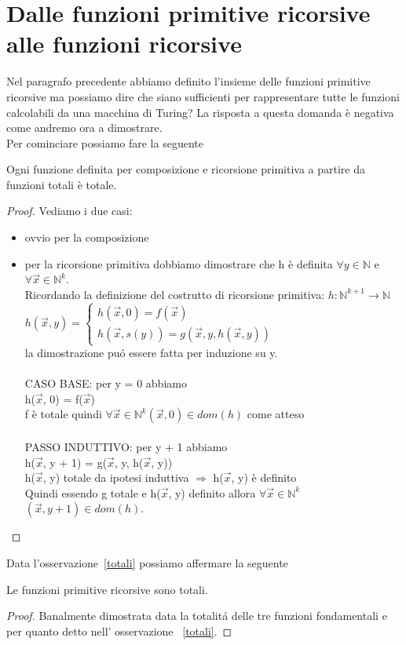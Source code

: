 \section{Dalle funzioni primitive ricorsive alle funzioni ricorsive}

Nel paragrafo precedente abbiamo definito l'insieme delle funzioni primitive
ricorsive ma possiamo dire che siano sufficienti per rappresentare tutte le
funzioni calcolabili da una macchina di Turing? La risposta a questa domanda \`e
negativa come andremo ora a dimostrare.\\
Per cominciare possiamo fare la seguente

\begin{osservazione}\label{totali} Ogni funzione definita per composizione e
ricorsione primitiva a partire da funzioni 
totali \`e totale.
\end{osservazione}
\begin{proof} Vediamo i due casi:\\
\begin{itemize}
\item ovvio per la composizione
\item per la ricorsione primitiva dobbiamo dimostrare che h \`e definita
$\forall y \in \mathbb{N}$ e $\forall \vec{x} \in \mathbb{N}^k$.\\
Ricordando la definizione del costrutto di ricorsione primitiva:
		$h:\mathbb{N}^{k+1} \to \mathbb{N}$\\
			$h(\vec{x},y)=\left\{ \begin{array}{ll}
			h(\vec{x}, 0) = f(\vec{x})\\
			h(\vec{x}, s(y)) = g(\vec{x},y,h(\vec{x},y))
			\end{array} \right.$\\
la dimostrazione pu\'o essere fatta per induzione su y.\\ \\
CASO BASE: per y = 0 abbiamo\\  h($\vec{x}$, 0) = f($\vec{x}$)\\
f \`e totale quindi $\forall \vec{x} \in \mathbb{N}^k (\vec{x}, 0) \in dom(h)$
come atteso\\ \\
PASSO INDUTTIVO: per y + 1 abbiamo\\
h($\vec{x}$, y + 1) = g($\vec{x}$, y, h($\vec{x}$, y))\\
h($\vec{x}$, y) totale da ipotesi induttiva $\Rightarrow$ h($\vec{x}$, y) \`e
definito\\
Quindi essendo g totale e h($\overrightarrow{x}$, y) definito allora $\forall
\overrightarrow{x} \in \mathbb{N}^k$  $(\vec{x}, y + 1) \in dom(h)$.
\end{itemize}
\end{proof}
Data l'osservazione~\ref{totali} possiamo affermare la seguente
\begin{proposizione}\label{PRsonoTotali} Le funzioni primitive ricorsive sono
totali.
\end{proposizione}
\begin{proof} Banalmente dimostrata data la totalit\'a delle tre funzioni
fondamentali e per quanto detto nell' osservazione ~\ref{totali}.
\end{proof}

